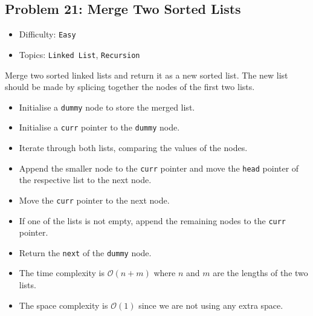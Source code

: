 \subsection*{Problem 21: Merge Two Sorted Lists}
\begin{itemize}
    \setlength\itemsep{0.1em}  %
    \setlength\parskip{0pt}    %
    \item Difficulty: \texttt{Easy}
    \item Topics: \texttt{Linked List}, \texttt{Recursion}
\end{itemize}
\begin{tcolorbox}[colback=gray!5!white, colframe=gray!80!black, boxrule=0.5pt, arc=2pt, left=6pt, right=6pt, top=6pt, bottom=6pt]
    Merge two sorted linked lists and return it as a new sorted list. The new list should be made by 
    splicing together the nodes of the first two lists.
\end{tcolorbox}

\begin{itemize}
    \item Initialise a \texttt{dummy} node to store the merged list.
    \item Initialise a \texttt{curr} pointer to the \texttt{dummy} node.
    \item Iterate through both lists, comparing the values of the nodes.
    \item Append the smaller node to the \texttt{curr} pointer and move the 
    \texttt{head} pointer of the respective list to the next node.
    \item Move the \texttt{curr} pointer to the next node.
    \item If one of the lists is not empty, append the remaining nodes to the \texttt{curr} pointer.
    \item Return the \texttt{next} of the \texttt{dummy} node.
    \item The time complexity is \(\mathcal{O}(n + m)\) where \(n\) and \(m\) are the lengths of the two lists.
    \item The space complexity is \(\mathcal{O}(1)\) since we are not using any extra space.
\end{itemize}

